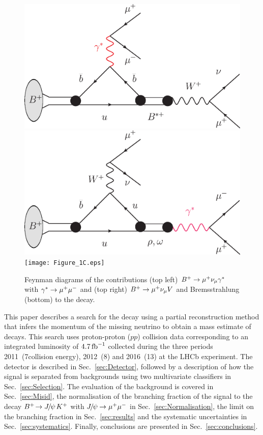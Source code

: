 \begin{figure}[ht]
  \begin{center}
    \includegraphics[width=0.45\linewidth]{Figure_1A.eps}
	  \hspace*{1.0cm}
    \includegraphics[width=0.45\linewidth]{Figure_1B.eps}
    \vspace*{-0.5cm}
    \texttt{[image: Figure\_1C.eps]}
  \end{center}
  \caption{Feynman diagrams of the contributions (top left)
    ${{{B}^+}}\rightarrow{\ensuremath{\mu^+}}{\ensuremath{{\nu}_\mu}}\gamma^{*}$ with $\gamma^{*}\rightarrow{\ensuremath{\mu^+\mu^-}}$ and (top right)
    ${{{B}^+}}\rightarrow{\ensuremath{\mu^+}}{\ensuremath{{\nu}_\mu}} V$ and Bremsstrahlung (bottom) to the \Bmumumu decay.}
  \label{fig:feyn}
\end{figure}

This paper describes a search for the decay \Bmumumu using a partial
reconstruction method that infers the momentum of the missing neutrino to
obtain a mass 
estimate of \Bmumumu decays. This search uses proton-proton ($pp$) collision
data corresponding to an integrated luminosity of $4.7\mbox{\,fb}^{-1}$ collected during the  three periods 2011~(7\tev collision energy), 2012~(8\tev) and 2016~(13\tev)
at the LHCb experiment. The detector is described in Sec.~\ref{sec:Detector}, followed by a description of how
the signal is separated from backgrounds using two multivariate classifiers in Sec.~\ref{sec:Selection}. The
evaluation of the background is covered in Sec.~\ref{sec:Misid}, the normalisation of the branching fraction of
the signal to the decay ${{{B}^+}}\!\rightarrow {\ensuremath{{J\mskip -3mu/\mskip -2mu\psi\mskip 2mu}}} {\ensuremath{{K}^+}}$ with ${{J\mskip -3mu/\mskip -2mu\psi\mskip 2mu}}\!\rightarrow {\ensuremath{\mu^+}}{\ensuremath{\mu^-}}$ in Sec.~\ref{sec:Normalisation},
the limit on the branching fraction in Sec.~\ref{sec:results} and the systematic uncertainties in
Sec.~\ref{sec:systematics}. Finally, conclusions are presented in Sec.~\ref{sec:conclusions}.

